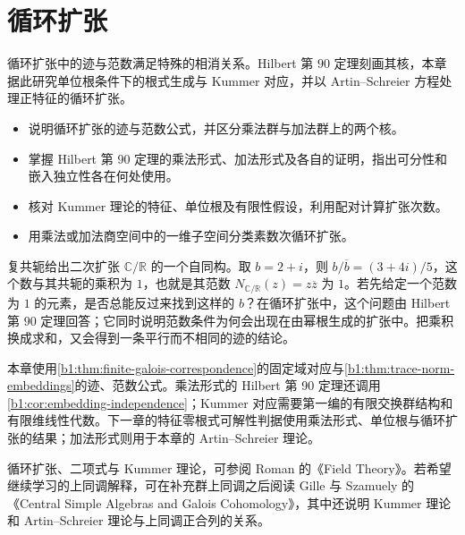 
\chapter[循环扩张]{循环扩张}
\label{b1:ch:20}

\begin{chapterabstract}
	循环扩张中的迹与范数满足特殊的相消关系。Hilbert 第 \(90\) 定理刻画其核，本章据此研究单位根条件下的根式生成与 Kummer 对应，并以 Artin--Schreier 方程处理正特征的循环扩张。
\end{chapterabstract}

\begin{learninggoals}
	\begin{itemize}
		\item 说明循环扩张的迹与范数公式，并区分乘法群与加法群上的两个核。
		\item 掌握 Hilbert 第 90 定理的乘法形式、加法形式及各自的证明，指出可分性和嵌入独立性各在何处使用。
		\item 核对 Kummer 理论的特征、单位根及有限性假设，利用配对计算扩张次数。
		\item 用乘法或加法商空间中的一维子空间分类素数次循环扩张。
	\end{itemize}
\end{learninggoals}

复共轭给出二次扩张 \(\mathbb C/\mathbb R\) 的一个自同构。取 \(b=2+i\)，则 \(b/\overline b=(3+4i)/5\)，这个数与其共轭的乘积为 \(1\)，也就是其范数 \(N_{\mathbb C/\mathbb R}(z)=z\overline z\) 为 \(1\)。若先给定一个范数为 \(1\) 的元素，是否总能反过来找到这样的 \(b\)？在循环扩张中，这个问题由 Hilbert 第 \(90\) 定理回答；它同时说明范数条件为何会出现在由幂根生成的扩张中。把乘积换成求和，又会得到一条平行而不相同的迹的结论。

\ProseParagraphBreak

本章使用\cref{b1:thm:finite-galois-correspondence}的固定域对应与\cref{b1:thm:trace-norm-embeddings}的迹、范数公式。乘法形式的 Hilbert 第 90 定理还调用\cref{b1:cor:embedding-independence}；Kummer 对应需要第一编的有限交换群结构和有限维线性代数。下一章的特征零根式可解性判据使用乘法形式、单位根与循环扩张的结果；加法形式则用于本章的 Artin--Schreier 理论。

\ProseParagraphBreak
循环扩张、二项式与 Kummer 理论，可参阅 Roman 的《Field Theory》\cite[Chapter 12; Sections 14.1--14.2, 15.1--15.3]{Roman2006FieldTheory}。若希望继续学习的上同调解释，可在补充群上同调之后阅读 Gille 与 Szamuely 的《Central Simple Algebras and Galois Cohomology》\cite[Example 2.3.4; Section 4.3]{GilleSzamuely2017CentralSimpleAlgebras}，其中还说明 Kummer 理论和 Artin--Schreier 理论与上同调正合列的关系。


